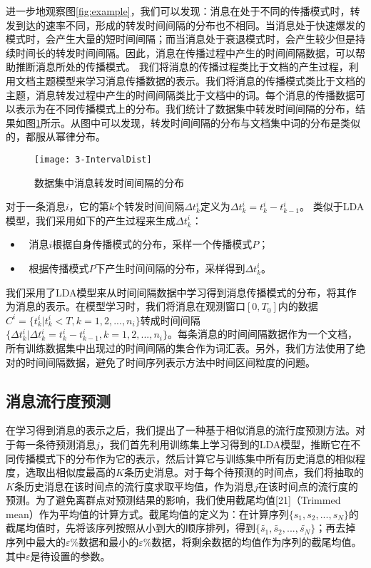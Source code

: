 进一步地观察图\ref{fig:example}，我们可以发现：消息在处于不同的传播模式时，转发到达的速率不同，形成的转发时间间隔的分布也不相同。当消息处于快速爆发的模式时，会产生大量的短时间间隔；而当消息处于衰退模式时，会产生较少但是持续时间长的转发时间间隔。因此，消息在传播过程中产生的时间间隔数据，可以帮助推断消息所处的传播模式。
我们将消息的传播过程类比于文档的产生过程，利用文档主题模型来学习消息传播数据的表示。我们将消息的传播模式类比于文档的主题，消息转发过程中产生的时间间隔类比于文档中的词。每个消息的传播数据可以表示为在不同传播模式上的分布。我们统计了数据集中转发时间间隔的分布，结果如图\ref{fig:intervalDist}所示。从图中可以发现，转发时间间隔的分布与文档集中词的分布是类似的，都服从幂律分布。
\begin{figure}[!htbp]
  \centering
  \texttt{[image: 3-IntervalDist]}
  \caption{数据集中消息转发时间间隔的分布}
  \label{fig:intervalDist}
\end{figure}

对于一条消息$i$，它的第$k$个转发时间间隔$\Delta t_k^i$定义为$\Delta t_k^i=t_k^i-t_{k-1}^i$。 类似于LDA模型，我们采用如下的产生过程来生成$\Delta t_k^i$：
\begin{itemize}
\item	消息$i$根据自身传播模式的分布，采样一个传播模式$P$；
\item	根据传播模式$P$下产生时间间隔的分布，采样得到$\Delta t_k^i$。
\end{itemize}

我们采用了LDA模型来从时间间隔数据中学习得到消息传播模式的分布，将其作为消息的表示。在模型学习时，我们将消息在观测窗口$[0,T_0]$内的数据$C^i=\{t_k^i|t_k^i<T,k=1,2,...,n_i\}$转成时间间隔 $\{\Delta t_k^i|\Delta t_k^i=t_k^i-t_{k-1}^i,k=1,2,...,n_i\}$。每条消息的时间间隔数据作为一个文档，所有训练数据集中出现过的时间间隔的集合作为词汇表。另外，我们方法使用了绝对的时间间隔数据，避免了时间序列表示方法中时间区间粒度的问题。

\subsection{消息流行度预测}
在学习得到消息的表示之后，我们提出了一种基于相似消息的流行度预测方法。对于每一条待预测消息$j$，我们首先利用训练集上学习得到的LDA模型，推断它在不同传播模式下的分布作为它的表示，然后计算它与训练集中所有历史消息的相似程度，选取出相似度最高的$K$条历史消息。对于每个待预测的时间点，我们将抽取的$K$条历史消息在该时间点的流行度求取平均值，作为消息$j$在该时间点的流行度的预测。为了避免离群点对预测结果的影响，我们使用截尾均值[21]（Trimmed mean）作为平均值的计算方式。截尾均值的定义为：在计算序列$\{s_1,s_2,...,s_N\}$的截尾均值时，先将该序列按照从小到大的顺序排列，得到$\{\widetilde{s_1},\widetilde{s_2},...,\widetilde{s_N}\}$；再去掉序列中最大的$\varepsilon$\%数据和最小的$\varepsilon$\%数据，将剩余数据的均值作为序列的截尾均值。其中$\varepsilon$是待设置的参数。

